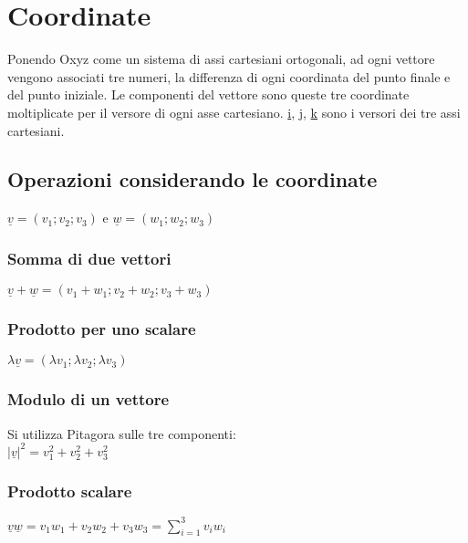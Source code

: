 \chapter{Coordinate}
Ponendo Oxyz come un sistema di assi cartesiani ortogonali, ad ogni vettore vengono associati tre numeri, la differenza di ogni coordinata del punto finale e del punto iniziale. Le componenti del vettore sono queste tre coordinate moltiplicate per il versore di ogni asse cartesiano. \underline{i}, \underline{j}, \underline{k} sono i versori
dei tre assi cartesiani.
\section{Operazioni considerando le coordinate}
$\underline{v}=(v_1;v_2;v_3)$ e $\underline{w}=(w_1;w_2;w_3)$
\subsection{Somma di due vettori}
$\underline{v}+\underline{w}=(v_1+w_1;v_2+w_2;v_3+w_3)$
\subsection{Prodotto per uno scalare}
$\lambda\underline{v}=(\lambda v_1;\lambda v_2;\lambda v_3)$
\subsection{Modulo di un vettore}
Si utilizza Pitagora sulle tre componenti:\\
$|\underline{v}|^2=v_1^2+v_2^2+v_3^2$
\subsection{Prodotto scalare}
$\underline{v}\underline{w}=v_1w_1+v_2w_2+v_3w_3=\sum\limits_{i=1}^3 v_iw_i$
